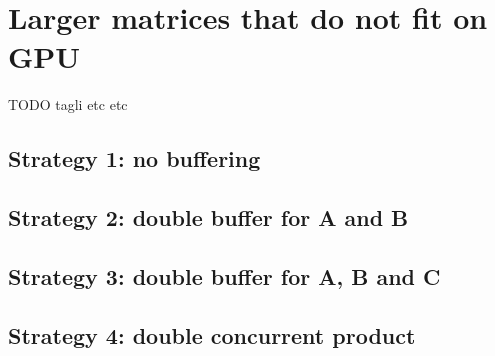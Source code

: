 \section{Larger matrices that do not fit on GPU}
TODO tagli etc etc
\subsection{Strategy 1: no buffering}
\subsection{Strategy 2: double buffer for A and B}
\subsection{Strategy 3: double buffer for A, B and C}
\subsection{Strategy 4: double concurrent product}
